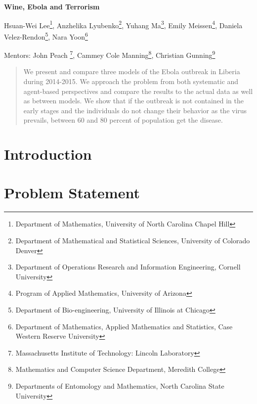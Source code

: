 \documentclass[10pt]{article}
\begin{document}
 

\centerline{\large \bf Wine, Ebola and Terrorism}

\vspace{.1truein}

\def\thefootnote{\arabic{footnote}}
\begin{center}
  Hsuan-Wei Lee\footnote{Department of Mathematics, University of North Carolina Chapel Hill},
  Anzhelika Lyubenko\footnote{Department of Mathematical and Statistical Sciences, University of Colorado Denver},
  Yuhang Ma\footnote{Department of Operations Research and Information Engineering, Cornell University},
  Emily Meissen\footnote{Program of Applied Mathematics, University of Arizona},
  Daniela Velez-Rendon\footnote{Department of Bio-engineering, University of Illinois at Chicago},
    Nara Yoon\footnote{
Department of Mathematics, Applied Mathematics and Statistics, Case Western Reserve University}
\end{center}


\begin{center}
Mentors: John Peach \footnote{Massachusetts Institute of Technology: Lincoln Laboratory}, Cammey Cole Manning\footnote{Mathematics and Computer Science Department, Meredith College},
Christian Gunning\footnote{Departments of Entomology and Mathematics, North Carolina State University}
\end{center}

\begin{abstract}
\noindent We present and compare three models of the Ebola outbreak in Liberia during 2014-2015. We approach the problem from both systematic and agent-based perspectives and compare the results to the actual data as well as between models. We show that if the outbreak is not contained in the early stages and the individuals do not change their behavior as the virus prevails, between 60 and 80 percent of population get the disease. 
\end{abstract}

\tableofcontents

\section{Introduction}



\section{Problem Statement}

\end{document}
